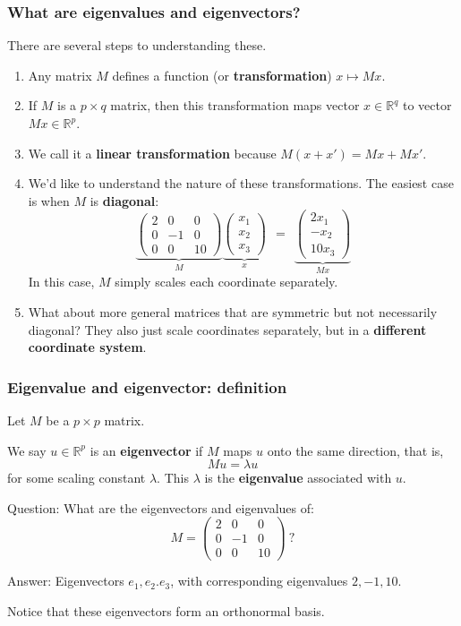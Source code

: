 \documentclass[smaller,handout]{beamer}
\def\R{{\mathbb R}}
\def\darkred{\color{red!70!black}}
\def\darkgreen{\color{green!60!black}}
\def\v2{{\vskip.2in}}
\def\R{{\mathbb R}}
\begin{document}
\begin{frame}
\frametitle{What are eigenvalues and eigenvectors?}

{\darkgreen There are several steps to understanding these.}
\begin{enumerate}
\item<2-> Any matrix $M$ defines a function (or {\bf transformation}) $x \mapsto Mx$.
\item<3-> If $M$ is a $p \times q$ matrix, then this transformation maps vector $x \in \R^q$ to vector $Mx \in \R^p$.
\item<4-> We call it a {\bf linear transformation} because $M(x + x') = Mx + Mx'$.
\item<5-> We'd like to understand the nature of these transformations. The easiest case is when $M$ is {\bf diagonal}:
$$
\underbrace{\begin{pmatrix}
2 & 0 & 0 \\
0 & -1 & 0 \\
0 & 0 & 10
\end{pmatrix}}_{M}
\underbrace{\begin{pmatrix} x_1 \\ x_2 \\ x_3 \end{pmatrix}}_{x}
\ \ = \ \ 
\underbrace{\begin{pmatrix} 2x_1 \\ -x_2 \\ 10x_3 \end{pmatrix}}_{Mx}
$$
In this case, $M$ simply scales each coordinate separately.
\item<6-> What about more general matrices that are symmetric but not necessarily diagonal? They also just scale coordinates separately, but in a {\bf different coordinate system}.
\end{enumerate}
\end{frame}

\begin{frame}
\frametitle{Eigenvalue and eigenvector: definition}

{\darkred 
Let $M$ be a $p \times p$ matrix. 

We say $u \in \R^p$ is an {\bf eigenvector} if $M$ maps $u$ onto the same direction, that is,
$$ Mu = \lambda u$$
for some scaling constant $\lambda$. This $\lambda$ is the {\bf eigenvalue} associated with $u$.}

\pause\v2
Question: What are the eigenvectors and eigenvalues of:
$$ M = \begin{pmatrix}
2 & 0 & 0 \\
0 & -1 & 0 \\
0 & 0 & 10
\end{pmatrix} \ ?
$$

\pause
Answer: Eigenvectors $e_1, e_2. e_3$, with corresponding eigenvalues $2,-1,10$.

\pause\v2
\alert{Notice that these eigenvectors form an orthonormal basis.}
\end{frame}
\end{document}
